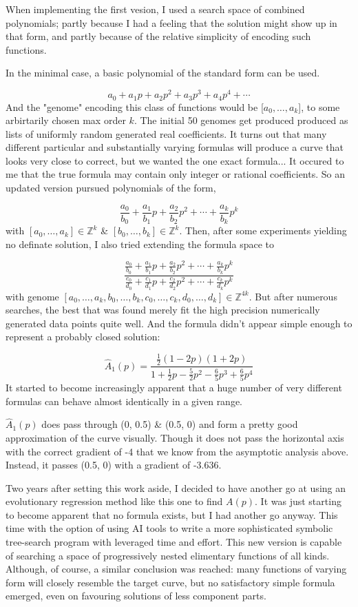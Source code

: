 \documentclass[11pt]{article}
\begin{document}
When implementing the first vesion, I used a search space of combined polynomials; partly because I 
had a feeling that the solution might show up in that form, and partly because of the relative simplicity
of encoding such functions. 

In the minimal case, a basic polynomial of the standard form can be used. 

$$a_0 + a_1p + a_2 p^2 + a_3 p^3 + a_4 p^4 + \cdots$$
And the "genome" encoding this class of functions would be [$a_0,\dots,a_k$], to some arbirtarily chosen max order $k$.
The initial 50 genomes get produced produced as lists of uniformly random generated real coefficients.
It turns out that many different particular and substantially varying formulas will produce a curve that looks very close to correct, but we wanted the one exact formula...
It occured to me that the true formula may contain only integer or rational coefficients. So an updated version pursued polynomials of the form,


$$\frac{a_0}{b_0} +\frac{a_1}{b_1}p +\frac{a_2}{b_2}p^2 +\cdots+\frac{a_k}{b_k}p^k$$
with $[a_0,\dots,a_k]\in\mathbb{Z}^k$ \& $[b_0,\dots,b_k]\in\mathbb{Z}^k$. Then, after some experiments yielding no definate solution, I also tried extending the formula space to 



$$\frac{\frac{a_0}{b_0} +\frac{a_1}{b_1}p +\frac{a_2}{b_2}p^2 +\cdots+\frac{a_k}{b_k}p^k}{\frac{c_0}{d_0} +\frac{c_1}{d_1}p +\frac{c_2}{d_2}p^2 +\cdots+\frac{c_k}{d_k}p^k}$$
with genome $[a_0,\dots,a_k,b_0,\dots,b_k,c_0,\dots,c_k,d_0,\dots,d_k]\in\mathbb{Z}^{4k}$.
But after numerous searches, the best that was found merely fit the high precision numerically generated data points quite well. And the formula didn't appear simple enough to represent a probably closed solution: 

$$\hat A_1(p) = \frac{\frac{1}{2}(1-2p)(1+2p)}{1 + \frac{1}{2}p - \frac{5}{2}p^2 - \frac{6}{5}p^3 + \frac{6}{5}p^4}$$
It started to become increasingly apparent that a huge number of very different formulas can behave almost identically in a given range. 

$\hat A_1(p)$ does pass through (0, 0.5) \& (0.5, 0) and form a pretty good approximation of the curve visually. Though it does not pass the horizontal axis with the correct gradient of -4 that we know from the asymptotic analysis above. Instead, it passes (0.5, 0) with a gradient of -3.636.

\vspace{10pt}
\noindent
Two years after setting this work aside, I decided to have another go at using an evolutionary regression method like this one to find $A(p)$.
It was just starting to become apparent that no formula exists, but I had another go anyway. This time with the option of using AI tools to write a 
more sophisticated symbolic tree-search program with leveraged time and effort. This new version is capable of searching a space of progressively nested elimentary functions of all kinds. Although, of course, a similar
conclusion was reached: many functions of varying form will closely resemble the target curve, but no satisfactory simple formula emerged, even on favouring solutions of less component parts.
\end{document}
